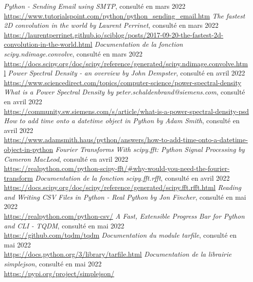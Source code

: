 \documentclass[11pt]{article}
\begin{document}
\begin{thebibliography}{100}
    \textit{Python - Sending Email using SMTP}, consulté en mars 2022\\\url{https://www.tutorialspoint.com/python/python_sending_email.htm}
    \textit{The fastest 2D convolution in the world by Laurent Perrinet}, consulté en mars 2022\\\url{https://laurentperrinet.github.io/sciblog/posts/2017-09-20-the-fastest-2d-convolution-in-the-world.html}
    \textit{Documentation de la fonction scipy.ndimage.convolve}, consulté en mars 2022\\\url{https://docs.scipy.org/doc/scipy/reference/generated/scipy.ndimage.convolve.html}
    \textit{Power Spectral Density - an overview by John Dempster}, consulté en avril 2022\\\url{https://www.sciencedirect.com/topics/computer-science/power-spectral-density}
    \textit{What is a Power Spectral Density by peter.schaldenbrand@siemens.com}, consulté en avril 2022\\\url{https://community.sw.siemens.com/s/article/what-is-a-power-spectral-density-psd}
    \textit{How to add time onto a datetime object in Python by Adam Smith}, consulté en avril 2022\\\url{https://www.adamsmith.haus/python/answers/how-to-add-time-onto-a-datetime-object-in-python}
    \textit{Fourier Transforms With scipy.fft: Python Signal Processing by Cameron MacLeod}, consulté en avril 2022\\\url{https://realpython.com/python-scipy-fft/#why-would-you-need-the-fourier-transform}
    \textit{Documentation de la fonction scipy.fft.rfft}, consulté en avril 2022\\\url{https://docs.scipy.org/doc/scipy/reference/generated/scipy.fft.rfft.html}
    \textit{Reading and Writing CSV Files in Python - Real Python by Jon Fincher}, consulté en mai 2022\\\url{https://realpython.com/python-csv/}
    \textit{A Fast, Extensible Progress Bar for Python and CLI - TQDM}, consulté en mai 2022\\\url{https://github.com/tqdm/tqdm}
    \textit{Documentation du module tarfile}, consulté en mai 2022\\\url{https://docs.python.org/3/library/tarfile.html}
    \textit{Documentation de la librairie simplejson}, consulté en mai 2022\\\url{https://pypi.org/project/simplejson/}

\end{thebibliography}
\end{document}
